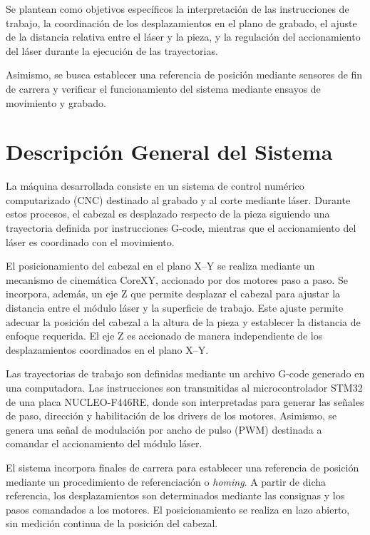 \documentclass[blue,fullpaper]{ludusofficial}  %
\begin{document}
Se plantean como objetivos específicos la interpretación
de las instrucciones de trabajo, la coordinación de los
desplazamientos en el plano de grabado, el ajuste de la
distancia relativa entre el láser y la pieza, y la regulación
del accionamiento del láser durante la ejecución de las
trayectorias.

Asimismo, se busca establecer una referencia de posición
mediante sensores de fin de carrera y verificar el
funcionamiento del sistema mediante ensayos de movimiento
y grabado.



\section{Descripción General del Sistema}

La máquina desarrollada consiste en un sistema de control numérico computarizado (CNC) destinado al grabado y al corte mediante láser. Durante estos procesos, el cabezal es desplazado respecto de la pieza siguiendo una trayectoria definida por instrucciones G-code, mientras que el accionamiento del láser es coordinado con el movimiento.

El posicionamiento del cabezal en el plano X–Y se realiza mediante un mecanismo de cinemática CoreXY, accionado por dos motores paso a paso. Se incorpora, además, un eje Z que permite desplazar el cabezal para ajustar la distancia entre el módulo láser y la superficie de trabajo. Este ajuste permite adecuar la posición del cabezal a la altura de la pieza y establecer la distancia de enfoque requerida. El eje Z es accionado de manera independiente de los desplazamientos coordinados en el plano X–Y.

Las trayectorias de trabajo son definidas mediante un archivo G-code generado en una computadora. Las instrucciones son transmitidas al microcontrolador STM32 de una placa NUCLEO-F446RE, donde son interpretadas para generar las señales de paso, dirección y habilitación de los drivers de los motores. Asimismo, se genera una señal de modulación por ancho de pulso (PWM) destinada a comandar el accionamiento del módulo láser.

El sistema incorpora finales de carrera para establecer una referencia de posición mediante un procedimiento de referenciación o \textit{homing}. A partir de dicha referencia, los desplazamientos son determinados mediante las consignas y los pasos comandados a los motores. El posicionamiento se realiza en lazo abierto, sin medición continua de la posición del cabezal.
\end{document}

